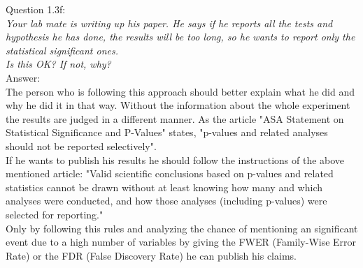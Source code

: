 
Question 1.3f:\\	
\textsl{Your lab mate is writing up his paper. He says if he reports all the tests and hypothesis he has done, the results will be too long, so he wants to report only the statistical significant ones.}\\
	
\textsl{Is this OK? If not, why?}\\

Answer:\\
The person who is following this approach should better explain what he did and why he did it in that way. Without the information about the whole experiment the results are judged in a different manner. As the article "ASA Statement on Statistical Significance and P-Values" states, "p-values and related analyses should not be reported selectively".\\

If he wants to publish his results he should follow the instructions of the above mentioned article: "Valid scientific conclusions based on p-values and related statistics cannot be drawn without at least knowing how many and which analyses were conducted, and how those analyses (including p-values) were selected for
reporting."\\

Only by following this rules and analyzing the chance of mentioning an significant event due to a high number of variables by giving the FWER (Family-Wise Error Rate) or the FDR (False Discovery Rate) he can publish his claims.


